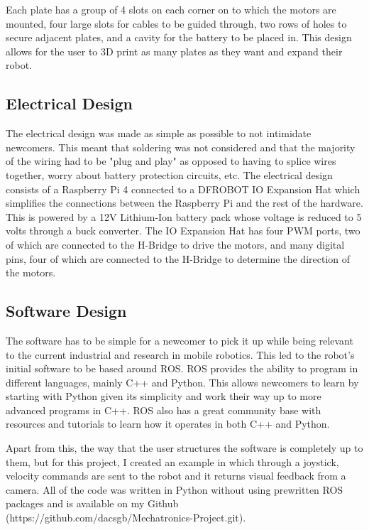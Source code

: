 \documentclass[12pt, letterpaper,titlepage]{article}
\begin{document}
    Each plate has a group of 4 slots on each corner on to which the motors are mounted, four large slots for cables to be guided through, two rows of holes to secure adjacent plates, and a cavity for the battery to be placed in. This design allows for the user to 3D print as many plates as they want and expand their robot.
	
\subsection{Electrical Design}
	The electrical design was made as simple as possible to not intimidate newcomers. This meant that soldering was not considered and that the majority of the wiring had to be "plug and play" as opposed to having to splice wires together, worry about battery protection circuits, etc. The electrical design consists of a Raspberry Pi 4 connected to a  DFROBOT IO Expansion Hat which simplifies the connections between the Raspberry Pi and the rest of the hardware. This is powered by a 12V Lithium-Ion battery pack whose voltage is reduced to 5 volts through a buck converter. The IO Expansion Hat has four PWM ports, two of which are connected to the H-Bridge to drive the motors, and many digital pins, four of which are connected to the H-Bridge to determine the direction of the motors.

\subsection{Software Design}
	The software has to be simple for a newcomer to pick it up while being relevant to the current industrial and research in mobile robotics. This led to the robot's initial software to be based around ROS. ROS provides the ability to program in different languages, mainly C++ and Python. This allows newcomers to learn by starting with Python given its simplicity and work their way up to more advanced programs in C++. ROS also has a great community base with resources and tutorials to learn how it operates in both C++ and Python. 

	Apart from this, the way that the user structures the software is completely up to them, but for this project, I created an example in which through a joystick, velocity commands are sent to the robot and it returns visual feedback from a camera. All of the code was written in Python without using prewritten ROS packages and is available on my Github (https://github.com/dacsgb/Mechatronics-Project.git). 
\end{document}
